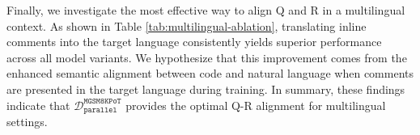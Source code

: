 %
Finally, we investigate the most effective way to align Q and R in a multilingual context.
%
As shown in Table \ref{tab:multilingual-ablation}, translating inline comments into the target language consistently yields superior performance across all model variants. 
%
We hypothesize that this improvement comes from the enhanced semantic alignment between code and natural language when comments are presented in the target language during training.
%
In summary, these findings indicate that $\mathcal{D}^\texttt{MGSM8KPoT}_\texttt{parallel}$ provides the optimal Q-R alignment for multilingual settings.
%
\begin{table}[htbp]
\small
  \centering
\end{table}
